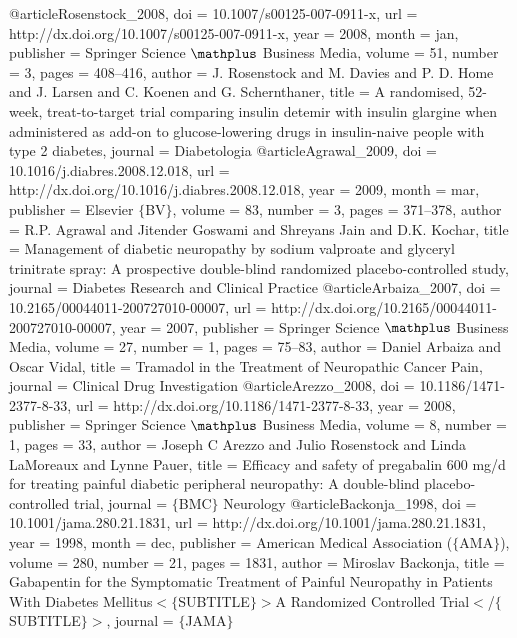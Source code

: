 @article{Rosenstock_2008,
	doi = {10.1007/s00125-007-0911-x},
	url = {http://dx.doi.org/10.1007/s00125-007-0911-x},
	year = 2008,
	month = {jan},
	publisher = {Springer Science $\mathplus$ Business Media},
	volume = {51},
	number = {3},
	pages = {408--416},
	author = {J. Rosenstock and M. Davies and P. D. Home and J. Larsen and C. Koenen and G. Schernthaner},
	title = {A randomised, 52-week, treat-to-target trial comparing insulin detemir with insulin glargine when administered as add-on to glucose-lowering drugs in insulin-naive people with type 2 diabetes},
	journal = {Diabetologia}
}
@article{Agrawal_2009,
	doi = {10.1016/j.diabres.2008.12.018},
	url = {http://dx.doi.org/10.1016/j.diabres.2008.12.018},
	year = 2009,
	month = {mar},
	publisher = {Elsevier $\lbrace$BV$\rbrace$},
	volume = {83},
	number = {3},
	pages = {371--378},
	author = {R.P. Agrawal and Jitender Goswami and Shreyans Jain and D.K. Kochar},
	title = {Management of diabetic neuropathy by sodium valproate and glyceryl trinitrate spray: A prospective double-blind randomized placebo-controlled study},
	journal = {Diabetes Research and Clinical Practice}
}
@article{Arbaiza_2007,
	doi = {10.2165/00044011-200727010-00007},
	url = {http://dx.doi.org/10.2165/00044011-200727010-00007},
	year = 2007,
	publisher = {Springer Science $\mathplus$ Business Media},
	volume = {27},
	number = {1},
	pages = {75--83},
	author = {Daniel Arbaiza and Oscar Vidal},
	title = {Tramadol in the Treatment of Neuropathic Cancer Pain},
	journal = {Clinical Drug Investigation}
}
@article{Arezzo_2008,
	doi = {10.1186/1471-2377-8-33},
	url = {http://dx.doi.org/10.1186/1471-2377-8-33},
	year = 2008,
	publisher = {Springer Science $\mathplus$ Business Media},
	volume = {8},
	number = {1},
	pages = {33},
	author = {Joseph C Arezzo and Julio Rosenstock and Linda LaMoreaux and Lynne Pauer},
	title = {Efficacy and safety of pregabalin 600 mg/d for treating painful diabetic peripheral neuropathy: A double-blind placebo-controlled trial},
	journal = {$\lbrace$BMC$\rbrace$ Neurology}
}
@article{Backonja_1998,
	doi = {10.1001/jama.280.21.1831},
	url = {http://dx.doi.org/10.1001/jama.280.21.1831},
	year = 1998,
	month = {dec},
	publisher = {American Medical Association ($\lbrace$AMA$\rbrace$)},
	volume = {280},
	number = {21},
	pages = {1831},
	author = {Miroslav Backonja},
	title = {Gabapentin for the Symptomatic Treatment of Painful Neuropathy in Patients With Diabetes Mellitus$\less$$\lbrace$SUBTITLE$\rbrace$$\greater$A Randomized Controlled Trial$\less$/$\lbrace$SUBTITLE$\rbrace$$\greater$},
	journal = {$\lbrace$JAMA$\rbrace$}
}
